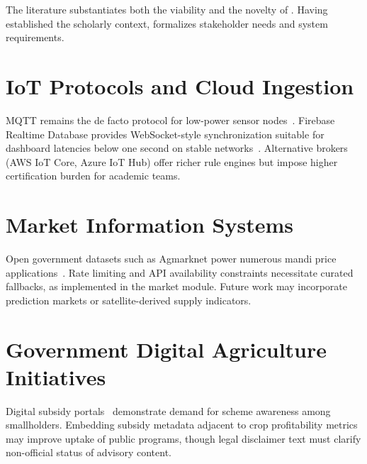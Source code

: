 The literature substantiates both the viability and the novelty of \HydroSmart. Having established the scholarly context,  formalizes stakeholder needs and system requirements.

\section{IoT Protocols and Cloud Ingestion}
\label{sec:lit_iot_protocols}

MQTT remains the de facto protocol for low-power sensor nodes~\cite{kumar2020iot_agri,ferreira2021hydro_iot}. Firebase Realtime Database provides WebSocket-style synchronization suitable for dashboard latencies below one second on stable networks~\cite{singh2023firebase_agri}. Alternative brokers (AWS IoT Core, Azure IoT Hub) offer richer rule engines but impose higher certification burden for academic teams.

\section{Market Information Systems}
\label{sec:lit_market}

Open government datasets such as Agmarknet power numerous mandi price applications~\cite{roy2022mandi_app}. Rate limiting and API availability constraints necessitate curated fallbacks, as implemented in the \HydroSmart{} market module. Future work may incorporate prediction markets or satellite-derived supply indicators.

\section{Government Digital Agriculture Initiatives}
\label{sec:lit_policy}

Digital subsidy portals~\cite{das2023subsidy_portal} demonstrate demand for scheme awareness among smallholders. Embedding subsidy metadata adjacent to crop profitability metrics may improve uptake of public programs, though legal disclaimer text must clarify non-official status of advisory content.

